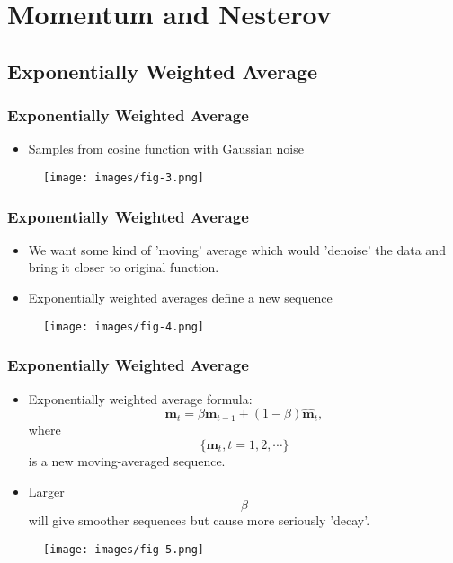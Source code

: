 \documentclass[10pt]{beamer}
\theoremstyle{mystyle}
\def\bb#1{\mathbf{#1}}
\theoremstyle{mystyle}
\begin{document}
\section{Momentum and Nesterov}

\subsection{Exponentially Weighted Average}
\begin{frame}
	\frametitle{Exponentially Weighted Average}
	\begin{itemize}
		\item Samples from cosine function with Gaussian noise
	\end{itemize}
	\begin{figure}[H]
		\centering
		\texttt{[image: images/fig-3.png]}
	\end{figure}
\end{frame}

\begin{frame}
	\frametitle{Exponentially Weighted Average}
	\begin{itemize}
		\item We want some kind of 'moving' average which would 'denoise' the data and bring it closer to original function.
		\item Exponentially weighted averages define a new sequence 
	\end{itemize}
	\begin{figure}[H]
		\centering
		\texttt{[image: images/fig-4.png]}
	\end{figure}
\end{frame}

\begin{frame}
	\frametitle{Exponentially Weighted Average}
	\begin{itemize}
		\item Exponentially weighted average formula:
		\begin{equation}
			\bb m_t = \beta\bb m_{t-1} + (1-\beta)\hat{\bb m}_t,
		\end{equation}
		where $$ \{\bb m_t, t=1,2,\cdots\} $$ is a new moving-averaged sequence. 
		\item Larger $$ \beta $$ will give smoother sequences but cause more seriously 'decay'.
	\end{itemize}
	
	\begin{figure}[H]
		\centering
		\texttt{[image: images/fig-5.png]}
	\end{figure}
\end{frame}
\end{document}
